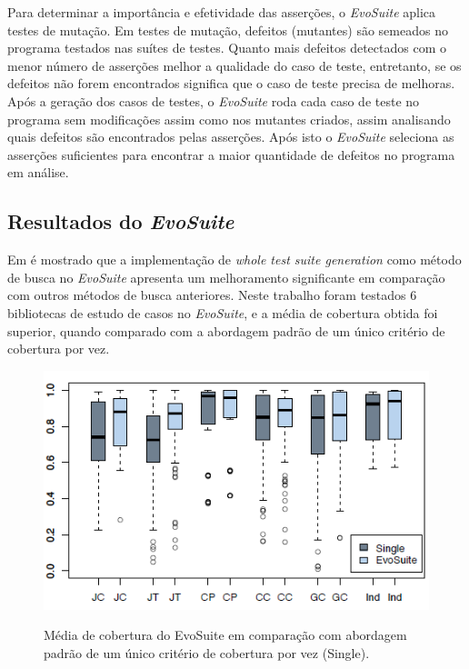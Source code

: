 \documentclass[conference]{IEEEtran}
\begin{document}
Para determinar a importância e efetividade das asserções, o \textit{EvoSuite} aplica testes de mutação. Em testes de mutação, defeitos (mutantes) são semeados no programa testados nas suítes de testes. Quanto mais defeitos detectados com o menor número de asserções melhor a qualidade do caso de teste, entretanto, se os defeitos não forem encontrados significa que o caso de teste precisa de melhoras. Após a geração dos casos de testes, o \textit{EvoSuite} roda cada caso de teste no programa sem modificações assim como nos mutantes criados, assim analisando quais defeitos são encontrados pelas asserções. Após isto o \textit{EvoSuite} seleciona as asserções suficientes para encontrar a maior quantidade de defeitos no programa em análise.

\subsection{Resultados do \textit{EvoSuite}}

Em \cite{fraser2013whole} é mostrado que a implementação de \textit{whole test suite generation} como método de busca no \textit{EvoSuite} apresenta um melhoramento significante em comparação com outros métodos de busca anteriores. Neste trabalho foram testados 6 bibliotecas de estudo de casos no \textit{EvoSuite}, e a média de cobertura obtida foi superior, quando comparado com a abordagem padrão de um único critério de cobertura por vez.

\begin{figure}[!htb]
  \centering
  \caption{Média de cobertura do EvoSuite em comparação com abordagem padrão de um único critério de cobertura por vez (Single).}
  \includegraphics[scale=0.7]{imagens/imagem1.png}
  \label{figura_cobertura}
\end{figure}
\end{document}
